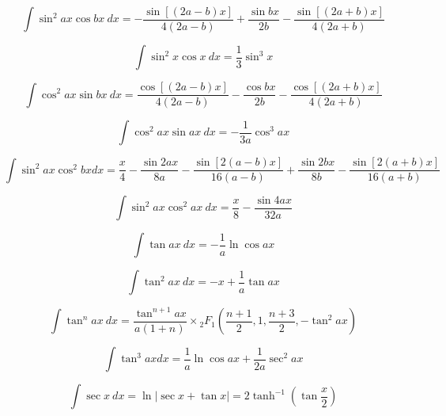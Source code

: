 \documentclass[12pt,a4paper,leqno]{article}
\begin{document}
   \begin{equation}
   \int \sin^2 ax \cos bx\ dx =
   -\frac{\sin[(2a-b)x]}{4(2a-b)}
   + \frac{\sin bx}{2b}
   - \frac{\sin[(2a+b)x]}{4(2a+b)}
   \end{equation}

   \begin{equation}
   \int \sin^2 x \cos x\ dx = \frac{1}{3} \sin^3 x
   \end{equation}

   \begin{equation}
   \int \cos^2 ax \sin bx\ dx = \frac{\cos[(2a-b)x]}{4(2a-b)}
   - \frac{\cos bx}{2b}
    - \frac{\cos[(2a+b)x]}{4(2a+b)}
   \end{equation}

   \begin{equation}
   \int \cos^2 ax \sin ax\ dx = -\frac{1}{3a}\cos^3{ax}
   \end{equation}



   \begin{equation}
   \int \sin^2 ax \cos^2 bx dx = \frac{x}{4}
   -\frac{\sin 2ax}{8a}-
   \frac{\sin[2(a-b)x]}{16(a-b)}
   +\frac{\sin 2bx}{8b}-
   \frac{\sin[2(a+b)x]}{16(a+b)}
   \end{equation}

   \begin{equation}
   \int \sin^2 ax \cos^2 ax\ dx = \frac{x}{8}-\frac{\sin 4ax}{32a}
   \end{equation}

   \begin{equation}
   \int \tan ax\ dx = -\frac{1}{a} \ln \cos ax
   \end{equation}

   \begin{equation}
   \int \tan^2 ax\ dx = -x + \frac{1}{a} \tan ax
   \end{equation}

   \begin{equation}
   \int \tan^n ax\ dx =
   \frac{\tan^{n+1} ax }{a(1+n)} \times
    {_2}F_1\left( \frac{n+1}{2},
   1, \frac{n+3}{2}, -\tan^2 ax \right)
   \end{equation}

   \begin{equation}
   \int \tan^3 ax dx = \frac{1}{a} \ln \cos ax + \frac{1}{2a}\sec^2 ax
   \end{equation}

   \begin{equation}
   \int \sec x \ dx = \ln | \sec x + \tan x | = 2 \tanh^{-1} \left (\tan \frac{x}{2} \right)
   \end{equation}
\end{document}
